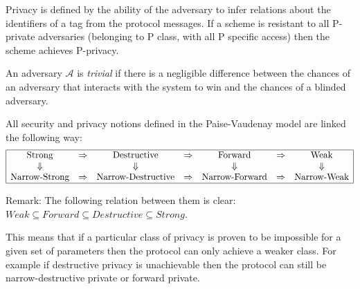     Privacy is defined by the ability of the adversary to infer relations about the identifiers of a tag from the protocol
    messages. If a scheme is resistant to all P-private adversaries (belonging to P class, with all
    P specific access) then the scheme achieves P-privacy.

    An adversary $\mathcal{A}$ is \textit{trivial} if there is a negligible difference between the chances
    of an adversary that interacts with the system to win and the chances of a blinded adversary.

    All security and privacy notions defined in the Paise-Vaudenay model are linked the following way:
    \[
    \begin{array}{|ccccccc|}
        \hline
        \text{Strong} & \Rightarrow & \text{Destructive} & \Rightarrow & \text{Forward} & \Rightarrow & \text{Weak} \\
        \Downarrow & &  \Downarrow  & &\Downarrow  & & \Downarrow \\
        \text{Narrow-Strong} & \Rightarrow & \text{Narrow-Destructive} & \Rightarrow & \text{Narrow-Forward} & \Rightarrow & \text{Narrow-Weak} \\
        \hline
    \end{array}
    \]

    Remark: The following relation between them is clear: $Weak \subseteq Forward \subseteq Destructive \subseteq Strong$.

    This means that if a particular class of privacy is proven to be impossible for a given set of parameters then the protocol can only 
    achieve a weaker class. For example if destructive privacy is unachievable then the protocol can still be narrow-destructive private or 
    forward private.
